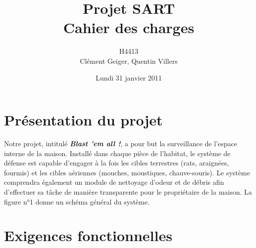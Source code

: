 \documentclass[12pt]{article}
\title{\textbf{Projet SART}\\Cahier des charges}
\author{H4413\\Clément Geiger, Quentin Villers}
\date{Lundi 31 janvier 2011}
\begin{document}
\maketitle

\thispagestyle{empty}

\vfill
\pagebreak

\section{Présentation du projet}

Notre projet, intitulé \textit{\textbf{Blast 'em all !}}, a pour but la
surveillance de l'espace interne de la maison. Installé dans chaque pièce
de l'habitat, le système de défense est capable d'engager à la fois les
cibles terrestres (rats, araignées, fourmis) et les cibles aériennes
(mouches, moustiques, chauve-souris). Le système comprendra également un
module de nettoyage d'odeur et de débris afin d'effectuer sa tâche de
manière transparente pour le propriétaire de la maison. La figure n°1
donne un schéma général du système.


\section{Exigences fonctionnelles}
\end{document}
